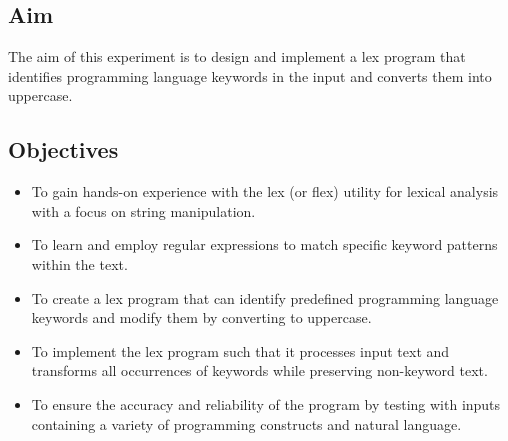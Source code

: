 \documentclass[12pt]{article}
\begin{document}
\subsection*{Aim}
The aim of this experiment is to design and implement a lex program that identifies programming language keywords in the input and converts them into uppercase.

\subsection*{Objectives}
\begin{itemize}
    \item To gain hands-on experience with the lex (or flex) utility for lexical analysis with a focus on string manipulation.
    \item To learn and employ regular expressions to match specific keyword patterns within the text.
    \item To create a lex program that can identify predefined programming language keywords and modify them by converting to uppercase.
    \item To implement the lex program such that it processes input text and transforms all occurrences of keywords while preserving non-keyword text.
    \item To ensure the accuracy and reliability of the program by testing with inputs containing a variety of programming constructs and natural language.
\end{itemize}
\end{document}
